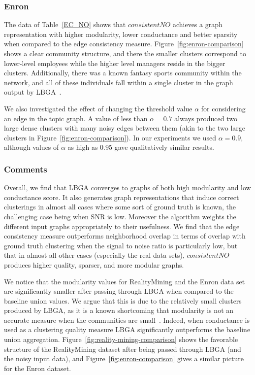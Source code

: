 \documentclass{article}
\begin{document}
\subsubsection{Enron}
\label{sec:enron-results}
The data of Table~\ref{EC_NO} shows that $consistentNO$ achieves a graph
representation with higher modularity, lower conductance and better sparsity
when compared to the edge consistency measure.
Figure~\ref{fig:enron-comparison} shows a clear community structure, and there
the smaller clusters correspond to lower-level employees while the higher level
managers reside in the bigger clusters. Additionally, there was a known fantasy
sports community within the network, and all of these individuals fall within a
single cluster in the graph output by LBGA~\cite{Mccallum05}. 

We also investigated the effect of changing the threshold value $\alpha$ for
considering an edge in the topic graph. A value of less than $\alpha = 0.7$
always produced two large dense clusters with many noisy edges between them
(akin to the two large clusters in Figure~\ref{fig:enron-comparison}). In our
experiments we used $\alpha = 0.9$, although values of $\alpha$ as high as
$0.95$ gave qualitatively similar results.


\subsubsection{Comments}
Overall, we find that LBGA converges to graphs of both high modularity and low
conductance score. It also generates graph representations that induce correct
clusterings in almost all cases where some sort of ground truth is known, the
challenging case being when SNR is low.  Moreover the algorithm weights the
different input graphs appropriately to their usefulness. We find that the edge
consistency measure outperforms neighborhood overlap in terms of overlap with
ground truth clustering when the signal to noise ratio is particularly low, but
that in almost all other cases (especially the real data sets), $consistentNO$
produces higher quality, sparser, and more modular graphs.

We notice that the modularity values for RealityMining and the Enron data set
are significantly smaller after passing through LBGA when compared to the
baseline union values. We argue that this is due to the relatively small
clusters produced by LBGA, as it is a known shortcoming that modularity is not
an accurate measure when the communities are small~\cite{Fortunato07}. Indeed,
when conductance is used as a clustering quality measure LBGA significantly
outperforms the baseline union aggregation.
Figure~\ref{fig:reality-mining-comparison} shows the favorable structure of the
RealityMining dataset after being passed through LBGA (and the noisy input
data), and Figure~\ref{fig:enron-comparison} gives a similar picture for the
Enron dataset. 
\end{document}
